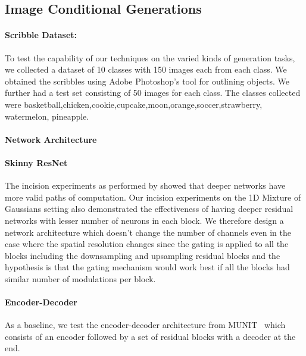 \subsection{Image Conditional Generations}

\paragraph{Scribble Dataset:}
To test the capability of our techniques on the varied kinds of generation tasks, we collected a dataset of 10 classes with 150 images each from each class. We obtained the scribbles using Adobe Photoshop's tool for outlining objects. We further had a test set consisting of 50 images for each class. The classes collected were basketball,chicken,cookie,cupcake,moon,orange,soccer,strawberry, watermelon, pineapple. 

\paragraph{Network Architecture}

\paragraph{Skinny ResNet}

The incision experiments as performed by \cite{veit2016residual} showed that deeper networks have more  valid paths of computation. Our incision experiments on the 1D Mixture of Gaussians setting also demonstrated the effectiveness of having deeper residual networks with lesser number of neurons in each block. We therefore design a network architecture which doesn't change the number of channels even in the case where the spatial resolution changes since the gating is applied to all the blocks including the downsampling and upsampling residual blocks and the hypothesis is that the gating mechanism would work best if all the blocks had similar number of modulations per block.

\paragraph{Encoder-Decoder} As a baseline, we test the encoder-decoder architecture from MUNIT~\cite{huang2018multimodal} which consists of an encoder followed by a set of residual blocks with a decoder at the end. 


